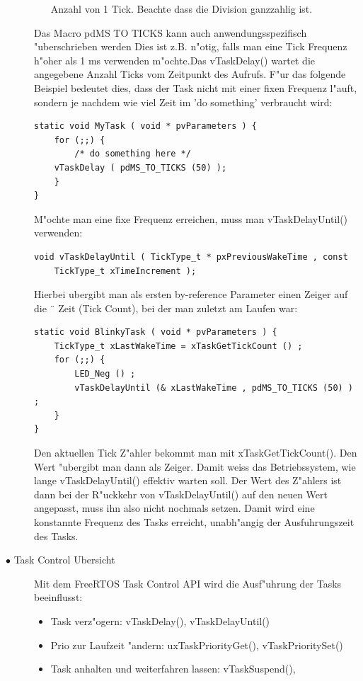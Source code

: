 \documentclass[a4paper, 8pt]{extarticle}
\begin{document}
\begin{multicols*}{3}
\begin{description}
\begin{itemize}
							Anzahl von 1 Tick. Beachte dass die Division ganzzahlig ist.
						\end{itemize}
						Das Macro pdMS TO TICKS kann auch anwendungsspezifisch "uberschrieben werden
						Dies ist z.B. n"otig, falls man eine Tick Frequenz h"oher als 1 ms verwenden
						m"ochte.Das vTaskDelay() wartet die angegebene Anzahl Ticks vom Zeitpunkt des
						Aufrufs. F"ur das folgende Beispiel bedeutet dies, dass der Task nicht mit 
						einer fixen Frequenz l"auft, sondern je nachdem wie viel Zeit im ’do something’
						verbraucht wird:
						\begin{lstlisting}
static void MyTask ( void * pvParameters ) {
	for (;;) {
		/* do something here */
	vTaskDelay ( pdMS_TO_TICKS (50) );
	}
}
						\end{lstlisting}  
						M"ochte man eine fixe Frequenz erreichen, muss man vTaskDelayUntil()
						verwenden:
						\begin{lstlisting}
void vTaskDelayUntil ( TickType_t * pxPreviousWakeTime , const
	TickType_t xTimeIncrement );
						\end{lstlisting}  
						Hierbei ubergibt man als ersten by-reference Parameter einen Zeiger auf die ¨
						Zeit (Tick Count), bei der man zuletzt am Laufen war:
						\begin{lstlisting}
static void BlinkyTask ( void * pvParameters ) {
	TickType_t xLastWakeTime = xTaskGetTickCount () ;
	for (;;) {
		LED_Neg () ;
		vTaskDelayUntil (& xLastWakeTime , pdMS_TO_TICKS (50) ) ;
	}
}
						\end{lstlisting} 
						Den aktuellen Tick Z"ahler bekommt man mit xTaskGetTickCount(). Den
						Wert "ubergibt man dann als Zeiger. Damit weiss das Betriebssystem, wie lange
						vTaskDelayUntil() effektiv warten soll. Der Wert des Z"ahlers ist dann bei der
						R"uckkehr von vTaskDelayUntil() auf den neuen Wert angepasst, muss ihn also
						nicht nochmals setzen. Damit wird eine konstannte Frequenz des Tasks erreicht,
						unabh"angig der Ausfuhrungszeit des Tasks.
					\item[$\bullet$ Task Control Ubersicht]
						Mit dem FreeRTOS Task Control API wird die Ausf"uhrung der Tasks beeinflusst:
					\begin{itemize}
						\item Task verz"ogern: vTaskDelay(), vTaskDelayUntil()
						\item Prio zur Laufzeit "andern: uxTaskPriorityGet(), vTaskPrioritySet()
						\item Task anhalten und weiterfahren lassen: vTaskSuspend(),

\end{itemize}
\end{description}
\end{multicols*}
\end{document}
